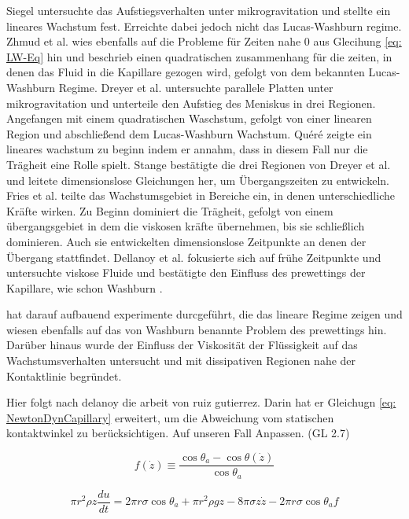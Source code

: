 Siegel \cite{siegel1961TransientCapillaryRise} untersuchte das Aufstiegsverhalten unter mikrogravitation und stellte ein lineares Wachstum fest. Erreichte dabei jedoch nicht das Lucas-Washburn regime. Zhmud et al. \cite{zhmud2000DynamicsCapillaryRise} wies ebenfalls auf die Probleme für Zeiten nahe $0$ aus Glecihung \ref{eq: LW-Eq} hin und beschrieb einen quadratischen zusammenhang für die zeiten, in denen das Fluid in die Kapillare gezogen wird, gefolgt von dem bekannten Lucas-Washburn Regime.
Dreyer et al. \cite{dreyer1994CapillaryRiseLiquid} untersuchte parallele Platten unter mikrogravitation und unterteile den Aufstieg des Meniskus in drei Regionen. Angefangen mit einem quadratischen Waschstum, gefolgt von einer linearen Region und abschließend dem Lucas-Washburn Wachstum. Quéré \cite{quere1997InertialCapillarity} zeigte ein lineares wachstum zu beginn indem er annahm, dass in diesem Fall nur die Trägheit eine Rolle spielt. Stange \cite{stange2003CapillaryDrivenFlow} bestätigte die drei Regionen von Dreyer et al. \cite{dreyer1994CapillaryRiseLiquid} und leitete dimensionslose Gleichungen her, um Übergangszeiten zu entwickeln. 
Fries et al. \cite{fries2008TransitionInertialViscous} teilte das Wachstumsgebiet in Bereiche ein, in denen unterschiedliche Kräfte wirken. Zu Beginn dominiert die Trägheit, gefolgt von einem übergangsgebiet in dem die viskosen kräfte übernehmen, bis sie schließlich dominieren. Auch sie entwickelten dimensionslose Zeitpunkte an denen der Übergang stattfindet. Dellanoy et al. \cite{delannoy2019DualRoleViscosity} fokusierte sich auf frühe Zeitpunkte und untersuchte viskose Fluide und bestätigte den Einfluss des prewettings der Kapillare, wie schon Washburn \cite{washburn1921DynamicsCapillaryFlow}. 



hat darauf aufbauend experimente durcgeführt, die das lineare Regime zeigen und wiesen ebenfalls auf das von Washburn \cite{washburn1921DynamicsCapillaryFlow} benannte Problem des prewettings hin. Darüber hinaus wurde der Einfluss der Viskosität der Flüssigkeit auf das Wachstumsverhalten untersucht und mit dissipativen Regionen nahe der Kontaktlinie begründet. 


Hier folgt nach delanoy die arbeit von ruiz gutierrez. Darin hat er Gleichugn \ref{eq: NewtonDynCapillary} erweitert, um die Abweichung vom statischen kontaktwinkel zu berücksichtigen. Auf unseren Fall Anpassen. (GL 2.7)

\begin{equation}
    f(\dot{z}) \equiv \frac{\cos\theta_{a}-\cos\theta(\dot{z})}{\cos\theta_a} 
\end{equation}

\begin{equation}
    \pi r^{2}\rho z \frac{du}{dt}= 2\pi r\sigma \cos\theta_{a}+\pi r^{2}\rho gz-8\pi \sigma z \dot{z} -2\pi r \sigma \cos \theta_{a}f
\end{equation}